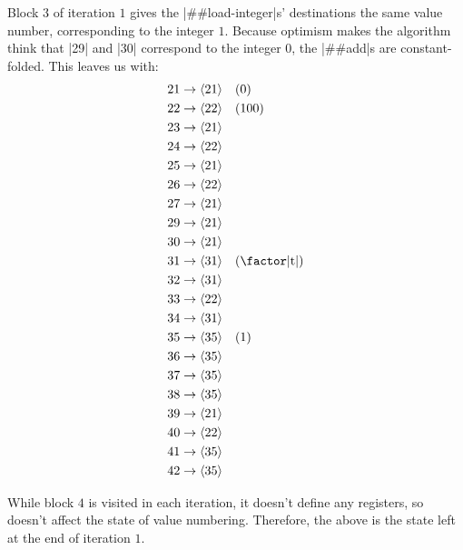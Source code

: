 Block $3$ of iteration $1$ gives the \factor|##load-integer|s' destinations the
same value number, corresponding to the integer $1$.  Because optimism makes
the algorithm think that \factor|29| and \factor|30| correspond to the integer
$0$, the \factor|##add|s are constant-folded.  This leaves us with:
%
\begin{align*}
  21 &\to \vn{21} \quad (0)                 \\
  22 &\to \vn{22} \quad (100)               \\
  23 &\to \vn{21}                           \\
  24 &\to \vn{22}                           \\
  25 &\to \vn{21}                           \\
  26 &\to \vn{22}                           \\
  27 &\to \vn{21}                           \\
  29 &\to \vn{21}                           \\
  30 &\to \vn{21}                           \\
  31 &\to \vn{31} \quad (\text{\factor|t|}) \\
  32 &\to \vn{31}                           \\
  33 &\to \vn{22}                           \\
  34 &\to \vn{31}                           \\
  35 &\to \vn{35} \quad (1)                 \\
  36 &\to \vn{35}                           \\
  37 &\to \vn{35}                           \\
  38 &\to \vn{35}                           \\
  39 &\to \vn{21}                           \\
  40 &\to \vn{22}                           \\
  41 &\to \vn{35}                           \\
  42 &\to \vn{35}
\end{align*}

While block $4$ is visited in each iteration, it doesn't define any registers,
so doesn't affect the state of value numbering.  Therefore, the above is the
state left at the end of iteration $1$.

